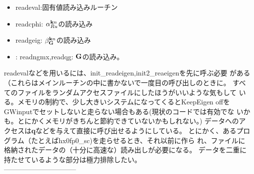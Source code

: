 \documentclass[twocolumn,showpacs,preprintnumbers,amsmath,amssymb,floatfix]{revtex4-1}
\newcommand{\bfk}{{\bf k}}
\begin{document}
\begin{itemize}
\item 
readeval:固有値読み込みルーチン
\item
readcphi: $\alpha^{{\bfk}n}_{Ru}$の読み込み
\item
readgeig: $\beta^{{\bfk}n}_{\bf G}$の読み込み
\item:
readngmx,readqg: ${\bf G}$の読み込み。
\end{itemize}
readevalなどを用いるには、init\_readeigen,init2\_reaeigenを先に呼ぶ必要
がある（これらはメインルーチンの中に書かないで一度目の呼び出しのときに。
すべてのファイルをランダムアクセスファイルにしたほうがいいような気もして
いる。メモリの制約で、少し大きいシステムになってくるとKeepEigen
offをGWinputでセットしないと走らない場合もある(現状のコードでは有効でな
いかも。とにかくメモリがきちんと節約できていないかもしれない。)
データへのアクセスは{\bf q}などを与えて直接に呼び出せるようにしている。
とにかく、あるプログラム（たとえばhx0fp0\_sc)を走らせるとき、それ以前に作ら
れ、ファイルに格納されたデータの（十分に高速な）読み出しが必要になる。
データを二重に持たせているような部分は極力排除したい。\\
--------------------------------\\
\end{document}
